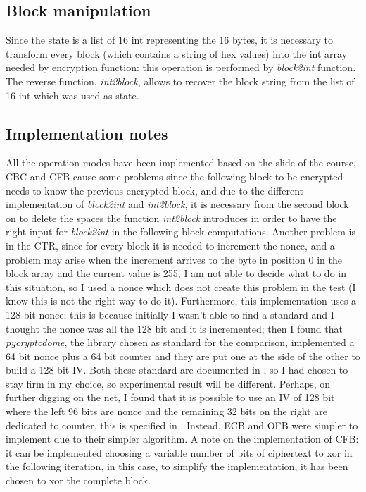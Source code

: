 \documentclass{article}
\begin{document}
\subsection{Block manipulation}

Since the state is a list of 16 int representing the 16 bytes, it is necessary to transform every block (which contains a string of hex values) into the int array needed by encryption function: this operation is performed by \textit{block2int} function. The reverse function, \textit{int2block}, allows to recover the block string from the list of 16 int which was used as state.  

\subsection{Implementation notes}

All the operation modes have been implemented based on the slide of the course, CBC and CFB cause some problems since the following block to be encrypted needs to know the previous encrypted block, and due to the different implementation of \textit{block2int} and \textit{int2block}, it is necessary from the second block on to delete the spaces the function \textit{int2block} introduces in order to have the right input for \textit{block2int} in the following block computations.
\newline
Another problem is in the CTR, since for every block it is needed to increment the nonce, and a problem may arise when the increment arrives to the byte in position 0 in the block array and the current value is 255, I am not able to decide what to do in this situation, so I used a nonce which does not create this problem in the test (I know this is not the right way to do it). Furthermore, this implementation uses a 128 bit nonce; this is because initially I wasn't able to find a standard and I thought the nonce was all the 128 bit and it is incremented; then I found that \textit{pycryptodome}, the library chosen as standard for the comparison, implemented a 64 bit nonce plus a 64 bit counter and they are put one at the side of the other to build a 128 bit IV. Both these standard are documented in \cite{NIST}, so I had chosen to stay firm in my choice, so experimental result will be different. Perhaps, on further digging on the net, I found that it is possible to use an IV of 128 bit where the left 96 bits are nonce and the remaining 32 bits on the right are dedicated to counter, this is specified in \cite{stack}.
\newline
Instead, ECB and OFB were simpler to implement due to their simpler algorithm.
\newline
A note on the implementation of CFB: it can be implemented choosing a variable number of bits of ciphertext to xor in the following iteration, in this case, to simplify the implementation, it has been chosen to xor the complete block. 
\end{document}
